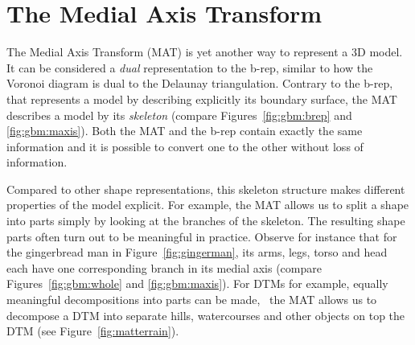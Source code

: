 
\setchapterpreamble[u]{\margintoc}

\graphicspath{{mat/}}

\chapter{The Medial Axis Transform}%
\label{chap:mat}

The Medial Axis Transform (MAT) is yet another way to represent a 3D model.
It can be considered a \emph{dual} representation to the b-rep, similar to how the Voronoi diagram is dual to the Delaunay triangulation. 
Contrary to the b-rep, that represents a model by describing explicitly its boundary surface, the MAT describes a model by its \emph{skeleton} (compare Figures~\ref{fig:gbm:brep} and \ref{fig:gbm:maxis}).
Both the MAT and the b-rep contain exactly the same information and it is possible to convert one to the other without loss of information.

Compared to other shape representations, this skeleton structure makes different properties of the model explicit.
For example, the MAT allows us to split a shape into parts simply by looking at the branches of the skeleton. 
The resulting shape parts often turn out to be meaningful in practice. 
Observe for instance that for the gingerbread man in Figure~\ref{fig:gingerman}, its arms, legs, torso and head each have one corresponding branch in its medial axis (compare Figures~\ref{fig:gbm:whole} and \ref{fig:gbm:maxis}).
For DTMs for example, equally meaningful decompositions into parts can be made, \eg\ the MAT allows us to decompose a DTM into separate hills, watercourses and other objects on top the DTM (see Figure~\ref{fig:matterrain}).

